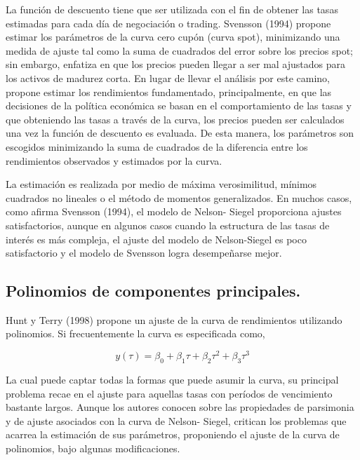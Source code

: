\hspace*{0.4 cm} La funci\'on de descuento tiene que ser utilizada con el fin de obtener las
tasas estimadas para cada d\'ia de negociaci\'on o trading. Svensson (1994)
propone estimar los par\'ametros de la curva cero cup\'on (curva spot),
minimizando una medida de ajuste tal como la suma de cuadrados del
error sobre los precios spot; sin embargo, enfatiza en que los precios
pueden llegar a ser mal ajustados para los activos de madurez corta. En
lugar de llevar el an\'alisis por este camino, propone estimar los
rendimientos fundamentado, principalmente, en que las decisiones de la
pol\'itica econ\'omica se basan en el comportamiento de las tasas y que
obteniendo las tasas a trav\'es de la curva, los precios pueden ser
calculados una vez la funci\'on de descuento es evaluada. De esta manera,
los par\'ametros son escogidos minimizando la suma de cuadrados de la
diferencia entre los rendimientos observados y estimados por la curva.

\hspace*{0.4 cm} La estimaci\'on es realizada por medio de m\'axima verosimilitud, m\'inimos
cuadrados no lineales o el m\'etodo de momentos generalizados. En
muchos casos, como afirma Svensson (1994), el modelo de Nelson-
Siegel proporciona ajustes satisfactorios, aunque en algunos casos
cuando la estructura de las tasas de inter\'es es m\'as compleja, el ajuste del
modelo de Nelson-Siegel es poco satisfactorio y el modelo de Svensson
logra desempe\~narse mejor.


\subsection{Polinomios de componentes principales.\\}


\hspace*{0.4 cm} Hunt y Terry (1998) propone un ajuste de la curva de rendimientos
utilizando polinomios. Si frecuentemente la curva es especificada como,

\begin{equation}
y(\tau) = \beta_{0} + \beta_{1}\tau +\beta_{2}\tau^2 +\beta_{3}\tau^3
\label{cp}
\end{equation}


\hspace*{0.4 cm} La cual puede captar todas la formas que puede asumir la curva, su
principal problema recae en el ajuste para aquellas tasas con per\'iodos de
vencimiento bastante largos. Aunque los autores conocen sobre las
propiedades de parsimonia y de ajuste asociados con la curva de Nelson-
Siegel, critican los problemas que acarrea la estimaci\'on de sus
par\'ametros, proponiendo el ajuste de la curva de polinomios, bajo
algunas modificaciones.

